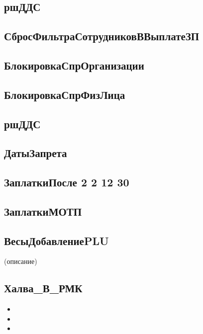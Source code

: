 \subsection{ршДДС}\label{504}
\subsection{СбросФильтраСотрудниковВВыплатеЗП}\label{505}
\subsection{БлокировкаСпрОрганизации}\label{506}
\subsection{БлокировкаСпрФизЛица}\label{507}
\subsection{ршДДС}\label{508}
\subsection{ДатыЗапрета}\label{509}
\subsection{ЗаплаткиПосле 2 2 12 30}\label{510}
\subsection{ЗаплаткиМОТП}\label{511}
\subsection{ВесыДобавлениеPLU}\label{512} (описание)
\subsection{Халва\_В\_РМК}\label{513}






\begin{itemize}[label={--}]	
	\item 
		\item 
		\item 	
	
	

	
	
	
\end{itemize}

